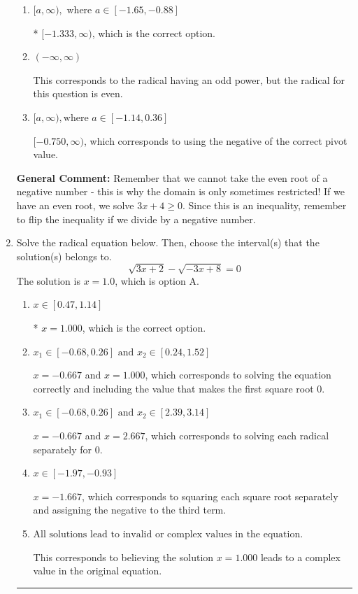 \documentclass{extbook}[14pt]
\newcommand{\litem}[1]{\item #1

\rule{\textwidth}{0.4pt}}
\begin{document}
\begin{enumerate}
{\begin{enumerate}[label=\Alph*.]
$(-\infty, -0.750]$, which corresponds to reversing the direction of the domain AND using the negative of the correct pivot value.
\item \( [a, \infty), \text{ where } a \in [-1.65, -0.88] \)

* $[-1.333, \infty)$, which is the correct option.
\item \( (-\infty, \infty) \)

This corresponds to the radical having an odd power, but the radical for this question is even.
\item \( [a, \infty), \text{where } a \in [-1.14, 0.36] \)

$[-0.750, \infty)$, which corresponds to using the negative of the correct pivot value.
\end{enumerate}

\textbf{General Comment:} Remember that we cannot take the even root of a negative number - this is why the domain is only sometimes restricted! If we have an even root, we solve $3 x + 4 \geq 0$. Since this is an inequality, remember to flip the inequality if we divide by a negative number.
}
\litem{
Solve the radical equation below. Then, choose the interval(s) that the solution(s) belongs to.
\[ \sqrt{3 x + 2} - \sqrt{-3 x + 8} = 0 \]The solution is \( x = 1.0 \), which is option A.\begin{enumerate}[label=\Alph*.]
\item \( x \in [0.47,1.14] \)

* $x = 1.000$, which is the correct option.
\item \( x_1 \in [-0.68, 0.26] \text{ and } x_2 \in [0.24,1.52] \)

$x = -0.667$ and $x = 1.000$, which corresponds to solving the equation correctly and including the value that makes the first square root 0.
\item \( x_1 \in [-0.68, 0.26] \text{ and } x_2 \in [2.39,3.14] \)

$x = -0.667$ and $x = 2.667$, which corresponds to solving each radical separately for 0.
\item \( x \in [-1.97,-0.93] \)

$x = -1.667$, which corresponds to squaring each square root separately and assigning the negative to the third term.
\item \( \text{All solutions lead to invalid or complex values in the equation.} \)

This corresponds to believing the solution $x = 1.000$ leads to a complex value in the original equation.
\end{enumerate}

}
\end{enumerate}
\end{document}

